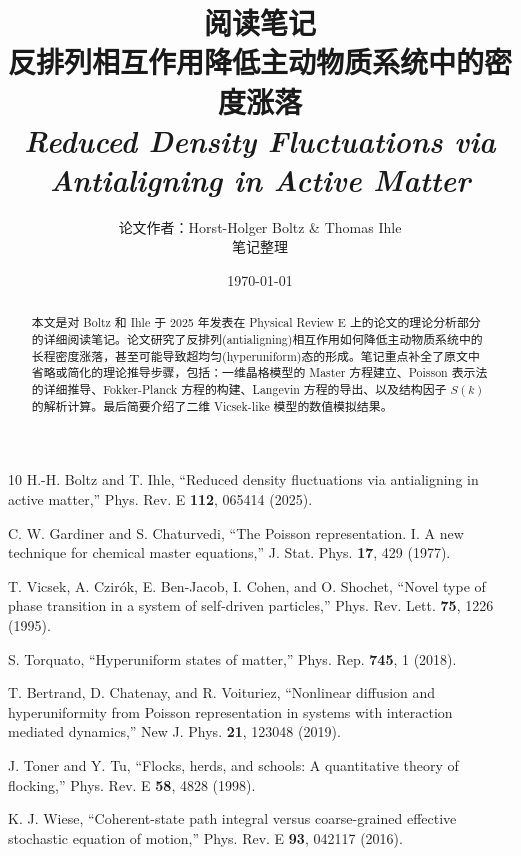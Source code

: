 \documentclass[a4paper,10pt]{article}
\title{
    \vspace{-1cm}
    {\Large\heiti 阅读笔记}\\[0.5em]
    {\LARGE\bfseries\heiti 反排列相互作用降低主动物质系统中的密度涨落}\\[0.3em]
    {\large\itshape Reduced Density Fluctuations via Antialigning in Active Matter}
}
\author{
    \kaishu 论文作者：Horst-Holger Boltz \& Thomas Ihle\\
    \kaishu 笔记整理
}
\date{\kaishu\today}
\theoremstyle{definition}
\theoremstyle{remark}
\begin{document}
\maketitle
\thispagestyle{fancy}

\begin{abstract}
\noindent
本文是对 Boltz 和 Ihle 于 2025 年发表在 Physical Review E 上的论文\cite{boltz2025}的理论分析部分的详细阅读笔记。论文研究了反排列(antialigning)相互作用如何降低主动物质系统中的长程密度涨落，甚至可能导致超均匀(hyperuniform)态的形成。笔记重点补全了原文中省略或简化的理论推导步骤，包括：一维晶格模型的 Master 方程建立、Poisson 表示法的详细推导、Fokker-Planck 方程的构建、Langevin 方程的导出、以及结构因子 $S(k)$ 的解析计算。最后简要介绍了二维 Vicsek-like 模型的数值模拟结果。
\end{abstract}

\tableofcontents
\newpage








\begin{thebibliography}{10}
H.-H. Boltz and T. Ihle,
``Reduced density fluctuations via antialigning in active matter,''
Phys. Rev. E \textbf{112}, 065414 (2025).

C. W. Gardiner and S. Chaturvedi,
``The Poisson representation. I. A new technique for chemical master equations,''
J. Stat. Phys. \textbf{17}, 429 (1977).

T. Vicsek, A. Czir\'{o}k, E. Ben-Jacob, I. Cohen, and O. Shochet,
``Novel type of phase transition in a system of self-driven particles,''
Phys. Rev. Lett. \textbf{75}, 1226 (1995).

S. Torquato,
``Hyperuniform states of matter,''
Phys. Rep. \textbf{745}, 1 (2018).

T. Bertrand, D. Chatenay, and R. Voituriez,
``Nonlinear diffusion and hyperuniformity from Poisson representation in systems with interaction mediated dynamics,''
New J. Phys. \textbf{21}, 123048 (2019).

J. Toner and Y. Tu,
``Flocks, herds, and schools: A quantitative theory of flocking,''
Phys. Rev. E \textbf{58}, 4828 (1998).

K. J. Wiese,
``Coherent-state path integral versus coarse-grained effective stochastic equation of motion,''
Phys. Rev. E \textbf{93}, 042117 (2016).
\end{thebibliography}
\end{document}
